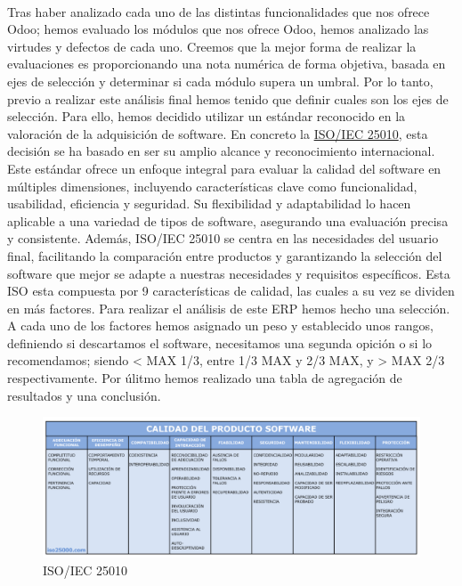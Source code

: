 \paragraph{}
Tras haber analizado cada uno de las distintas funcionalidades que nos ofrece Odoo; hemos evaluado los módulos que nos ofrece Odoo, hemos analizado las virtudes y defectos de cada uno. Creemos que la mejor forma de realizar la evaluaciones es proporcionando una nota numérica de forma objetiva, basada en ejes de selección y determinar si cada módulo supera un umbral. Por lo tanto, previo a realizar este análisis final hemos tenido que definir cuales son los ejes de selección. Para ello, hemos decidido utilizar un estándar reconocido en la valoración de la adquisición de software. En concreto la \href{https://iso25000.com/index.php/normas-iso-25000/iso-25010}{ISO/IEC 25010}, esta decisión se ha basado en ser su amplio alcance y reconocimiento internacional. Este estándar ofrece un enfoque integral para evaluar la calidad del software en múltiples dimensiones, incluyendo características clave como funcionalidad, usabilidad, eficiencia y seguridad. Su flexibilidad y adaptabilidad lo hacen aplicable a una variedad de tipos de software, asegurando una evaluación precisa y consistente. Además, ISO/IEC 25010 se centra en las necesidades del usuario final, facilitando la comparación entre productos y garantizando la selección del software que mejor se adapte a nuestras necesidades y requisitos específicos. Esta ISO esta compuesta por 9 características de calidad, las cuales a su vez se dividen en más factores. Para realizar el análisis de este ERP hemos hecho una selección. A cada uno de los factores hemos asignado un peso y establecido unos rangos, definiendo si descartamos el software, necesitamos una segunda opición o si lo recomendamos; siendo \textless{} MAX 1/3, entre 1/3 MAX y 2/3 MAX, y \textgreater{} MAX 2/3 respectivamente. Por úlitmo hemos realizado una tabla de agregación de resultados y una conclusión.

\begin{figure}
    \centering
    \includegraphics[width=1\linewidth]{final/isoo.png}
    \caption{ISO/IEC 25010}
    \label{fig:enter-label}
\end{figure}
\newpage
